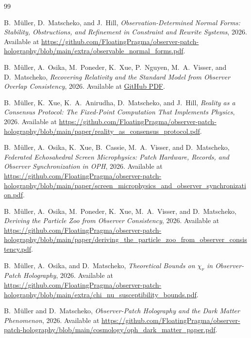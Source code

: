 \begin{thebibliography}{99}

B.~M\"uller, D.~Matscheko, and J.~Hill,
\emph{Observation-Determined Normal Forms: Stability, Obstructions, and Refinement in Constraint
and Rewrite Systems},
2026.
Available at \url{https://github.com/FloatingPragma/observer-patch-holography/blob/main/extra/observable_normal_forms.pdf}.

B.~M\"uller, A.~Osika, M.~Poneder, K.~Xue, P.~Nguyen, M.~A.~Visser, and D.~Matscheko,
\emph{Recovering Relativity and the Standard Model from Observer Overlap Consistency},
2026.
Available at \href{https://github.com/FloatingPragma/observer-patch-holography/blob/main/paper/recovering_relativity_and_standard_model_structure_from_observer_overlap_consistency_compact.pdf}{GitHub PDF}.

B.~M\"uller, K.~Xue, K.~A.~Anirudha, D.~Matscheko, and J.~Hill,
\emph{Reality as a Consensus Protocol: The Fixed-Point Computation That Implements Physics},
2026.
Available at \url{https://github.com/FloatingPragma/observer-patch-holography/blob/main/paper/reality_as_consensus_protocol.pdf}.

B.~M\"uller, A.~Osika, K.~Xue, B.~Cassie, M.~A.~Visser, and D.~Matscheko,
\emph{Federated Echosahedral Screen Microphysics: Patch Hardware, Records, and Observer Synchronization in OPH},
2026.
Available at \url{https://github.com/FloatingPragma/observer-patch-holography/blob/main/paper/screen_microphysics_and_observer_synchronization.pdf}.

B.~M\"uller, A.~Osika, M.~Poneder, K.~Xue, M.~A.~Visser, and D.~Matscheko,
\emph{Deriving the Particle Zoo from Observer Consistency},
2026.
Available at \url{https://github.com/FloatingPragma/observer-patch-holography/blob/main/paper/deriving_the_particle_zoo_from_observer_consistency.pdf}.

B.~M\"uller, A.~Osika, and D.~Matscheko,
\emph{Theoretical Bounds on \(\chi_\nu\) in Observer-Patch Holography},
2026.
Available at \url{https://github.com/FloatingPragma/observer-patch-holography/blob/main/extra/chi_nu_susceptibility_bounds.pdf}.

B.~M\"uller and D.~Matscheko,
\emph{Observer-Patch Holography and the Dark Matter Phenomenon},
2026.
Available at \url{https://github.com/FloatingPragma/observer-patch-holography/blob/main/cosmology/oph_dark_matter_paper.pdf}.


\end{thebibliography}
